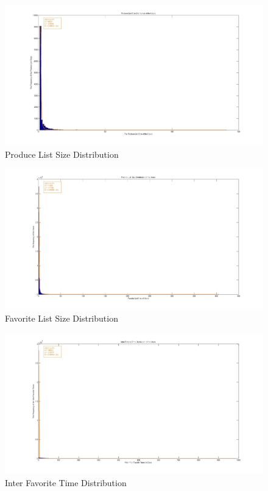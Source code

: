\documentclass[12pt,a4paper]{report}
\begin{document}
	\vspace{5cm}
	\begin{figure}
	\hspace{-3.7cm}\includegraphics[width=200mm]{userProdDist.jpg}
	\caption{Produce List Size Distribution}
	\end{figure}

	\vspace{5cm}
	\begin{figure}
	\hspace{-3.7cm}\includegraphics[width=200mm]{userFavDist.jpg}
	\caption{Favorite List Size Distribution}
	\end{figure}

	\vspace{5cm}
	\begin{figure}
	\hspace{-3.7cm}\includegraphics[width=200mm]{userInterDist.jpg}
	\caption{Inter Favorite Time Distribution}	
	\end{figure}
\end{document}
